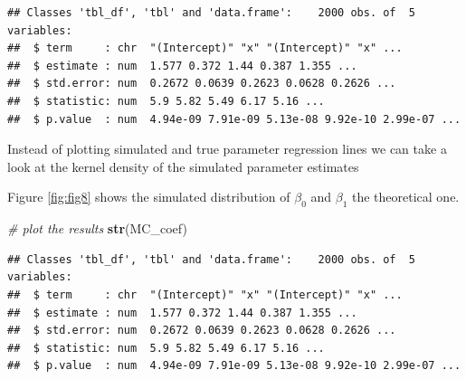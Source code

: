\documentclass[]{book}
\newenvironment{Shaded}{\begin{snugshade}}{\end{snugshade}}
\newcommand{\CommentTok}[1]{\textcolor[rgb]{0.56,0.35,0.01}{\textit{#1}}}
\newcommand{\DataTypeTok}[1]{\textcolor[rgb]{0.13,0.29,0.53}{#1}}
\newcommand{\KeywordTok}[1]{\textcolor[rgb]{0.13,0.29,0.53}{\textbf{#1}}}
\newcommand{\NormalTok}[1]{#1}
\newcommand{\OperatorTok}[1]{\textcolor[rgb]{0.81,0.36,0.00}{\textbf{#1}}}
\newcommand{\StringTok}[1]{\textcolor[rgb]{0.31,0.60,0.02}{#1}}
\begin{document}
\begin{verbatim}
## Classes 'tbl_df', 'tbl' and 'data.frame':    2000 obs. of  5 variables:
##  $ term     : chr  "(Intercept)" "x" "(Intercept)" "x" ...
##  $ estimate : num  1.577 0.372 1.44 0.387 1.355 ...
##  $ std.error: num  0.2672 0.0639 0.2623 0.0628 0.2626 ...
##  $ statistic: num  5.9 5.82 5.49 6.17 5.16 ...
##  $ p.value  : num  4.94e-09 7.91e-09 5.13e-08 9.92e-10 2.99e-07 ...
\end{verbatim}

Instead of plotting simulated and true parameter regression lines we can take a look at the kernel density of the simulated parameter estimates

Figure \ref{fig:fig8} shows the simulated distribution of \(\beta_{0}\) and \(\beta_{1}\) the theoretical one.

\begin{Shaded}
\begin{Highlighting}[]
\CommentTok{# plot the results}
\KeywordTok{str}\NormalTok{(MC_coef)}
\end{Highlighting}
\end{Shaded}

\begin{verbatim}
## Classes 'tbl_df', 'tbl' and 'data.frame':    2000 obs. of  5 variables:
##  $ term     : chr  "(Intercept)" "x" "(Intercept)" "x" ...
##  $ estimate : num  1.577 0.372 1.44 0.387 1.355 ...
##  $ std.error: num  0.2672 0.0639 0.2623 0.0628 0.2626 ...
##  $ statistic: num  5.9 5.82 5.49 6.17 5.16 ...
##  $ p.value  : num  4.94e-09 7.91e-09 5.13e-08 9.92e-10 2.99e-07 ...
\end{verbatim}

\begin{Shaded}
\end{Shaded}
\end{document}
